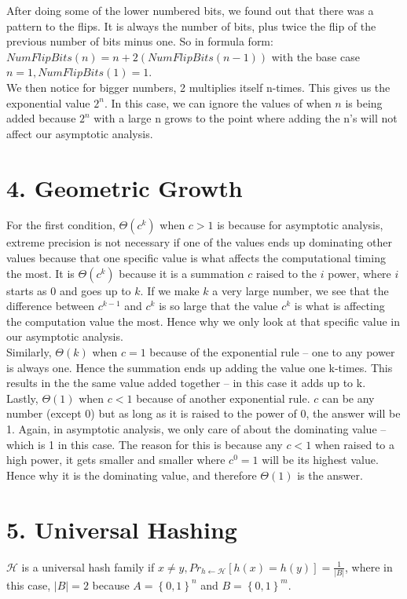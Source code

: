 \documentclass[11pt]{article}
\begin{document}
After doing some of the lower numbered bits, we found out that there was a pattern to the flips. It is always the number of bits, plus twice the flip of the previous number of bits minus one. So in formula form: $NumFlipBits(n) = n + 2(NumFlipBits(n-1))$ with the base case $n = 1, NumFlipBits(1) = 1$. \\

We then notice for bigger numbers, 2 multiplies itself n-times. This gives us the exponential value $2^{n}$. In this case, we can ignore the values of when $n$ is being added because $2^n$ with a large n grows to the point where adding the n's will not affect our asymptotic analysis.


\newpage
\section*{4. Geometric Growth}
For the first condition, $\Theta(c^{k})$ when $c > 1$ is because for asymptotic analysis, extreme precision is not necessary if one of the values ends up dominating other values because that one specific value is what affects the computational timing the most. It is $\Theta(c^k)$ because it is a summation $c$ raised to the $i$ power, where $i$ starts as 0 and goes up to $k$. If we make $k$ a very large number, we see that the difference between $c^{k-1}$ and $c^k$ is so large that the value $c^{k}$ is what is affecting the computation value the most. Hence why we only look at that specific value in our asymptotic analysis. \\

Similarly, $\Theta(k)$ when $c = 1$ because of the exponential rule -- one to any power is always one. Hence the summation ends up adding the value one k-times. This results in the the same value added together -- in this case it adds up to k. \\

Lastly, $\Theta(1)$ when $c < 1$ because of another exponential rule. $c$ can be any number (except 0) but as long as it is raised to the power of 0, the answer will be 1. Again, in asymptotic analysis, we only care of about the dominating value -- which is 1 in this case. The reason for this is because any $c < 1$ when raised to a high power, it gets smaller and smaller where $c^0 = 1$ will be its highest value. Hence why it is the dominating value, and therefore $\Theta(1)$ is the answer. 


\newpage
\section*{5. Universal Hashing}
$\mathcal{H}$ is a universal hash family if $x \neq y, Pr_{h\leftarrow\mathcal{H}}[h(x) = h(y)] = \frac{1}{|B|}$, where in this case, $|B| = 2$ because $A = \left\{0,1\right\}^n$ and $B = \left\{0,1\right\}^m$. \\
\end{document}
